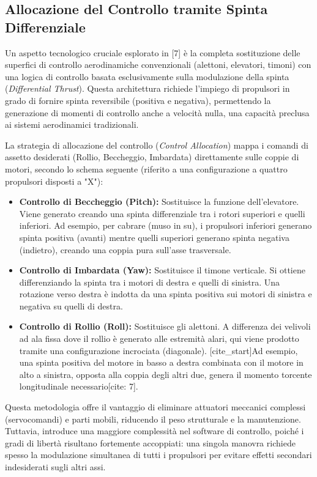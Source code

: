 \documentclass[a4paper,12pt]{article}
\begin{document}
\subsection{Allocazione del Controllo tramite Spinta Differenziale}
Un aspetto tecnologico cruciale esplorato in [7] è la completa sostituzione delle superfici di controllo aerodinamiche convenzionali (alettoni, elevatori, timoni) con una logica di controllo basata esclusivamente sulla modulazione della spinta (\textit{Differential Thrust}).
Questa architettura richiede l'impiego di propulsori in grado di fornire spinta reversibile (positiva e negativa), permettendo la generazione di momenti di controllo anche a velocità nulla, una capacità preclusa ai sistemi aerodinamici tradizionali.

La strategia di allocazione del controllo (\textit{Control Allocation}) mappa i comandi di assetto desiderati (Rollio, Beccheggio, Imbardata) direttamente sulle coppie di motori, secondo lo schema seguente (riferito a una configurazione a quattro propulsori disposti a "X"):

\begin{itemize}
    \item \textbf{Controllo di Beccheggio (Pitch):} Sostituisce la funzione dell'elevatore. Viene generato creando una spinta differenziale tra i rotori superiori e quelli inferiori. Ad esempio, per cabrare (muso in su), i propulsori inferiori generano spinta positiva (avanti) mentre quelli superiori generano spinta negativa (indietro), creando una coppia pura sull'asse trasversale.
    
    \item \textbf{Controllo di Imbardata (Yaw):} Sostituisce il timone verticale. Si ottiene differenziando la spinta tra i motori di destra e quelli di sinistra. Una rotazione verso destra è indotta da una spinta positiva sui motori di sinistra e negativa su quelli di destra.
    
    \item \textbf{Controllo di Rollio (Roll):} Sostituisce gli alettoni. A differenza dei velivoli ad ala fissa dove il rollio è generato alle estremità alari, qui viene prodotto tramite una configurazione incrociata (diagonale). [cite_start]Ad esempio, una spinta positiva del motore in basso a destra combinata con il motore in alto a sinistra, opposta alla coppia degli altri due, genera il momento torcente longitudinale necessario[cite: 7].
\end{itemize}

Questa metodologia offre il vantaggio di eliminare attuatori meccanici complessi (servocomandi) e parti mobili, riducendo il peso strutturale e la manutenzione. Tuttavia, introduce una maggiore complessità nel software di controllo, poiché i gradi di libertà risultano fortemente accoppiati: una singola manovra richiede spesso la modulazione simultanea di tutti i propulsori per evitare effetti secondari indesiderati sugli altri assi.
\end{document}
